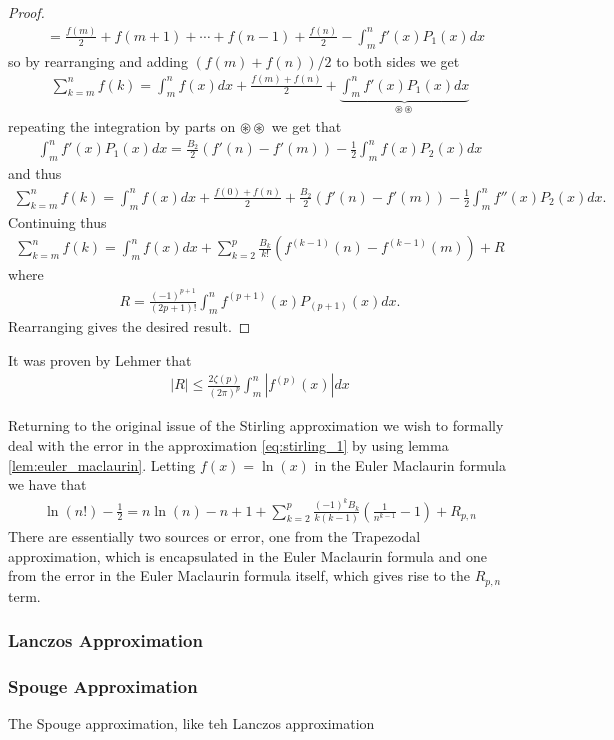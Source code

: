 \begin{proof}
\begin{align}
        &= \frac{f(m)}{2} + f(m+1) + \cdots + f(n-1) + \frac{f(n)}{2} - \int_{m}^{n} f'(x) P_1(x) dx
    \end{align}
    so by rearranging and adding $ \left( f(m) + f(n) \right) / 2 $ to both sides we get
    \begin{align}
        \sum_{k=m}^{n} f(k) =  \int_{m}^{n} f(x)dx + \frac{f(m) + f(n)}{2} + \underbrace{\int_{m}^{n} f'(x)P_1(x) dx}_{\circledast \circledast}
    \end{align}
    repeating the integration by parts on $ \circledast \circledast $ we get that
    \begin{align}
       \int_{m}^{n} f'(x) P_1(x)dx = \frac{B_2}{2}\left( f'(n) - f'(m) \right) - \frac{1}{2} \int_m^n f(x)P_2(x) dx
    \end{align}
    and thus
    \begin{align}
        \sum_{k=m}^n f(k) = \int_{m}^{n} f(x)dx + \frac{f(0)+f(n)}{2} + \frac{B_2}{2} \left( f'(n) - f'(m) \right) - \frac{1}{2} \int_{m}^{n} f''(x)P_2(x) dx.
    \end{align}
    Continuing thus
    \begin{align}
        \sum_{k=m}^{n} f(k) = \int_m^n f(x)dx + \sum_{k=2}^{p} \frac{B_k}{k!} \left( f^{(k-1)}(n) - f^{(k-1)}(m)\right) + R
    \end{align}
    where
    \begin{align}
        R = \frac{(-1)^{p+1}}{(2p+1)!} \int_{m}^n f^{(p+1)}(x) P_{(p+1)}(x) dx.
    \end{align} 
    Rearranging gives the desired result.
\end{proof}
It was proven by Lehmer \cite{Lehmer1940} that
\begin{align}
    |R| \leq \frac{2\zeta(p)}{(2\pi)^p} \int_{m}^{n} | f^{(p)}(x) | dx 
\end{align}

Returning to the original issue of the Stirling approximation we wish to formally deal with the error in the approximation \eqref{eq:stirling_1} by using lemma \ref{lem:euler_maclaurin}.
Letting $ f(x) = \ln(x) $ in the Euler Maclaurin formula we have that
\begin{align}
    \ln(n!) - \frac{1}{2} = n\ln(n) - n + 1 + \sum_{k=2}^p \frac{(-1)^kB_k}{k(k-1)} \left( \frac{1}{n^{k-1}} - 1 \right) + R_{p,n}
\end{align}
There are essentially two sources or error, one from the Trapezodal approximation, which is encapsulated in the Euler Maclaurin formula and one from the error in the Euler Maclaurin formula itself, which gives rise to the $ R_{p,n} $ term. 



\subsubsection{Lanczos Approximation}

\subsubsection{Spouge Approximation}
The Spouge approximation, like teh Lanczos approximation 

\clearpage
